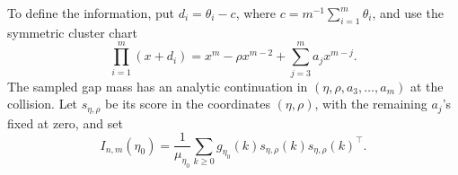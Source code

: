 To define the information, put \(d_i=\theta_i-c\), where
\(c=m^{-1}\sum_{i=1}^m\theta_i\), and use the symmetric cluster chart
\begin{equation}
 \prod_{i=1}^m(x+d_i)
 =x^m-\rho x^{m-2}+\sum_{j=3}^m a_jx^{m-j}.
\label{eq:main-symmetric-cluster-chart}
\end{equation}
The sampled gap mass has an analytic continuation in
\((\eta,\rho,a_3,\ldots,a_m)\) at the collision.  Let
\(s_{\eta,\rho}\) be its score in the coordinates \((\eta,\rho)\), with
the remaining \(a_j\)'s fixed at zero, and set
\begin{equation}
 I_{n,m}(\eta_0)=\frac1{\mu_{\eta_0}}
 \sum_{k\ge0}g_{\eta_0}(k)
 s_{\eta,\rho}(k)s_{\eta,\rho}(k)^\top.
\label{eq:main-multiple-information}
\end{equation}

